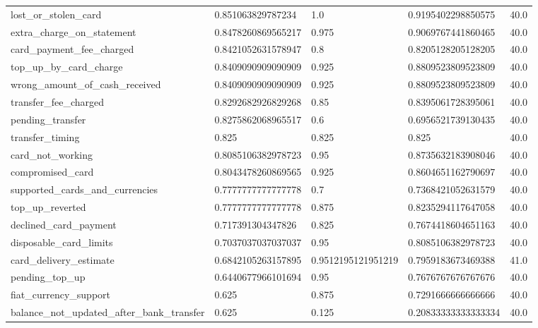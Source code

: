 \begin{table}[!ht]
\begin{tabularx}{\textwidth}{X l l l l}
lost\_or\_stolen\_card & \num{0.851063829787234} & \num{1.0} & \num{0.9195402298850575} & \num{40.0} \\
extra\_charge\_on\_statement & \num{0.8478260869565217} & \num{0.975} & \num{0.9069767441860465} & \num{40.0} \\
card\_payment\_fee\_charged & \num{0.8421052631578947} & \num{0.8} & \num{0.8205128205128205} & \num{40.0} \\
top\_up\_by\_card\_charge & \num{0.8409090909090909} & \num{0.925} & \num{0.8809523809523809} & \num{40.0} \\
wrong\_amount\_of\_cash\_received & \num{0.8409090909090909} & \num{0.925} & \num{0.8809523809523809} & \num{40.0} \\
transfer\_fee\_charged & \num{0.8292682926829268} & \num{0.85} & \num{0.8395061728395061} & \num{40.0} \\
pending\_transfer & \num{0.8275862068965517} & \num{0.6} & \num{0.6956521739130435} & \num{40.0} \\
transfer\_timing & \num{0.825} & \num{0.825} & \num{0.825} & \num{40.0} \\
card\_not\_working & \num{0.8085106382978723} & \num{0.95} & \num{0.8735632183908046} & \num{40.0} \\
compromised\_card & \num{0.8043478260869565} & \num{0.925} & \num{0.8604651162790697} & \num{40.0} \\
supported\_cards\_and\_currencies & \num{0.7777777777777778} & \num{0.7} & \num{0.7368421052631579} & \num{40.0} \\
top\_up\_reverted & \num{0.7777777777777778} & \num{0.875} & \num{0.8235294117647058} & \num{40.0} \\
declined\_card\_payment & \num{0.717391304347826} & \num{0.825} & \num{0.7674418604651163} & \num{40.0} \\
disposable\_card\_limits & \num{0.7037037037037037} & \num{0.95} & \num{0.8085106382978723} & \num{40.0} \\
card\_delivery\_estimate & \num{0.6842105263157895} & \num{0.9512195121951219} & \num{0.7959183673469388} & \num{41.0} \\
pending\_top\_up & \num{0.6440677966101694} & \num{0.95} & \num{0.7676767676767676} & \num{40.0} \\
fiat\_currency\_support & \num{0.625} & \num{0.875} & \num{0.7291666666666666} & \num{40.0} \\
balance\_not\_updated\_after\_bank\_transfer & \num{0.625} & \num{0.125} & \num{0.20833333333333334} & \num{40.0} \\

\end{tabularx}
\end{table}
